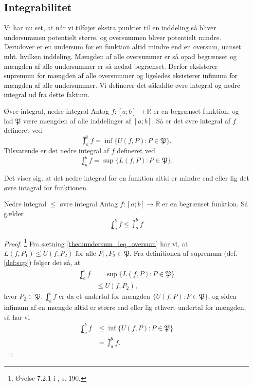 \subsection{Integrabilitet}%
  \label{sub:Integrabilitet}

Vi har nu set, at når vi tilføjer ekstra punkter til en inddeling så bliver undersummen potentielt større, og oversummen bliver potentielt mindre.
Derudover er en undersum for en funktion altid mindre end en oversum, uanset mht. hvilken inddeling.
Mængden af alle oversummer er så opad begrænset og mængden af alle undersummer er så nedad begrænset. 
Derfor eksisterer supremum for mængden af alle oversummer og ligeledes eksisterer infimum for mængden af alle undersummer.
Vi definerer det såkaldte øvre integral og nedre integral ud fra dette faktum.

\begin{definition}[label=def:øvre_nedre_integral]{Øvre integral, nedre integral}{}
  Antag $f:[a;b] \to \mathbb{R}$ er en begrænset funktion, og lad $\mathfrak{P}$ være mængden af alle inddelinger af $[a;b]$.
  Så er det øvre integral af $f$ defineret ved
  \[
  \upint_{a}^{b} f = \inf \{ U(f, P):P \in \mathfrak{P} \}.
  \] 
  Tilsvarende er det nedre integral af $f$ defineret ved
  \[
  \lowint_{a}^{b} f = \sup \{ L(f, P):P \in \mathfrak{P} \}.
  \] 
\end{definition}

Det viser sig, at det nedre integral for en funktion altid er mindre end eller lig det øvre intagral for funktionen.

\begin{theorem}[label=theo:Nedre_int_leq_øvre_int]{Nedre integral $\leq$ øvre integral }{}
  Antag $f:[a;b] \to \mathbb{R}$ er en begrænset funktion. 
  Så gælder
  \[
  \lowint_{a}^{b} f \leq \upint_{a}^{b} f  
  \]
\end{theorem}
\begin{proof} 
  \footnote{Øvelse 7.2.1 i \cite{Abbott2002}, s. 190.}
  Fra sætning \ref{theo:undersum_leq_oversum} har vi, at $L(f,P_1) \leq U(f,P_2) \text{ for alle }P_1, P_2 \in \mathfrak{P}$.
  Fra definitionen af supremum (def. \ref{def:sup}) følger det så, at 
\begin{equation*}
\begin{split}
  \lowint_{a}^{b} f &= \sup \{ L(f, P) : P \in \mathfrak{P}\} \\
  &\leq U(f, P_2),
\end{split}
\end{equation*}
  hvor $P_2 \in \mathfrak{P}$.
  $\lowint_{a}^{b} f $ er da et undertal for mængden $\{ U(f, P): P \in \mathfrak{P}\} $, og siden infimum af en mængde altid er større end eller lig ethvert undertal for mængden, så har vi
  \begin{equation*}
  \begin{split}
    \lowint_{a}^{b} f &\leq \inf \{ U(f, P): P \in \mathfrak{P} \} \\
    &=\upint_{a}^{b} f.  
  \end{split}
  \end{equation*}
\end{proof}

